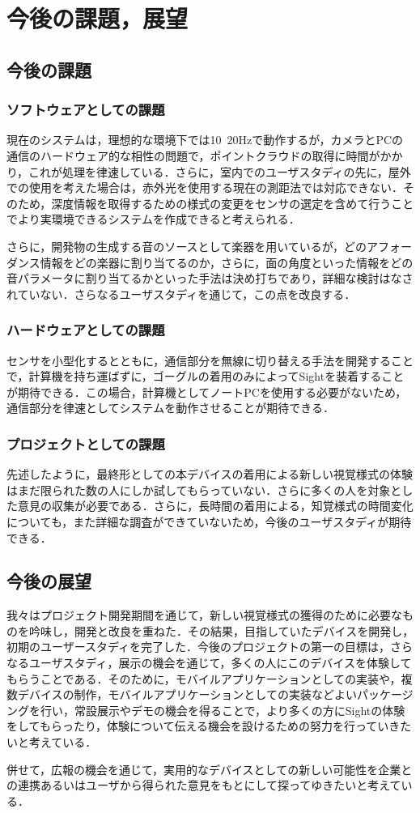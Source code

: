 \section{今後の課題，展望}
\subsection{今後の課題}
\subsubsection{ソフトウェアとしての課題}
現在のシステムは，理想的な環境下では10~20Hzで動作するが，カメラとPCの通信のハードウェア的な相性の問題で，ポイントクラウドの取得に時間がかかり，これが処理を律速している．さらに，室内でのユーザスタディの先に，屋外での使用を考えた場合は，赤外光を使用する現在の測距法では対応できない．そのため，深度情報を取得するための様式の変更をセンサの選定を含めて行うことでより実環境できるシステムを作成できると考えられる．

さらに，開発物の生成する音のソースとして楽器を用いているが，どのアフォーダンス情報をどの楽器に割り当てるのか，さらに，面の角度といった情報をどの音パラメータに割り当てるかといった手法は決め打ちであり，詳細な検討はなされていない．さらなるユーザスタディを通じて，この点を改良する．
\subsubsection{ハードウェアとしての課題}
センサを小型化するとともに，通信部分を無線に切り替える手法を開発することで，計算機を持ち運ばずに，ゴーグルの着用のみによってSightを装着することが期待できる．この場合，計算機としてノートPCを使用する必要がないため，通信部分を律速としてシステムを動作させることが期待できる．
\subsubsection{プロジェクトとしての課題}
先述したように，最終形としての本デバイスの着用による新しい視覚様式の体験はまだ限られた数の人にしか試してもらっていない．さらに多くの人を対象とした意見の収集が必要である．さらに，長時間の着用による，知覚様式の時間変化についても，また詳細な調査ができていないため，今後のユーザスタディが期待できる．

\subsection{今後の展望}
我々はプロジェクト開発期間を通じて，新しい視覚様式の獲得のために必要なものを吟味し，開発と改良を重ねた．その結果，目指していたデバイスを開発し，初期のユーザースタディを完了した．今後のプロジェクトの第一の目標は，さらなるユーザスタディ，展示の機会を通じて，多くの人にこのデバイスを体験してもらうことである．そのために，モバイルアプリケーションとしての実装や，複数デバイスの制作，モバイルアプリケーションとしての実装などよいパッケージングを行い，常設展示やデモの機会を得ることで，より多くの方にSightの体験をしてもらったり，体験について伝える機会を設けるための努力を行っていきたいと考えている．

併せて，広報の機会を通じて，実用的なデバイスとしての新しい可能性を企業との連携あるいはユーザから得られた意見をもとにして探ってゆきたいと考えている．